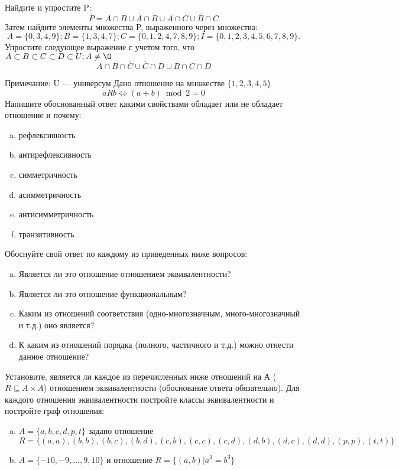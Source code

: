 \documentclass[10pt]{exam}
\begin{document}
\begin{questions}
\question
Найдите и упростите P:
\begin{equation*}
\overline{P} = A \cap B \cup \overline{A} \cap \overline{B} \cup A \cap C \cup \overline{B} \cap C
\end{equation*}
Затем найдите элементы множества P, выраженного через множества:
\begin{equation*}
A = \{0, 3, 4, 9\}; 
B = \{1, 3, 4, 7\};
C = \{0, 1, 2, 4, 7, 8, 9\};
I = \{0, 1, 2, 3, 4, 5, 6, 7, 8, 9\}.
\end{equation*}\question
Упростите следующее выражение с учетом того, что $A\subset B \subset C \subset D \subset U; A \neq \O$
\begin{equation*}
A \cap B  \cap \overline{C} \cup \overline{C} \cap D \cup B \cap C \cap D
\end{equation*}

Примечание: U — универсум\question
Дано отношение на множестве $\{1, 2, 3, 4, 5\}$ 
\begin{equation*}
aRb \iff (a+b) \bmod 2 =0
\end{equation*}
Напишите обоснованный ответ какими свойствами обладает или не обладает отношение и почему:   
\begin{enumerate} [a)]\setcounter{enumi}{0}
\item рефлексивность
\item антирефлексивность
\item симметричность
\item асимметричность
\item антисимметричность
\item транзитивность
\end{enumerate}

Обоснуйте свой ответ по каждому из приведенных ниже вопросов:
\begin{enumerate} [a)]\setcounter{enumi}{0}
    \item Является ли это отношение отношением эквивалентности?
    \item Является ли это отношение функциональным?
    \item Каким из отношений соответствия (одно-многозначным, много-многозначный и т.д.) оно является?
    \item К каким из отношений порядка (полного, частичного и т.д.) можно отнести данное отношение?
\end{enumerate}



\question
Установите, является ли каждое из перечисленных ниже отношений на А ($R \subseteq A \times A$) отношением эквивалентности (обоснование ответа обязательно). Для каждого отношения эквивалентности постройте классы 
эквивалентности и постройте граф отношения:
\begin{enumerate} [a)]\setcounter{enumi}{0}
\item $A = \{a, b, c, d, p, t\}$ задано отношение $R = \{(a, a), (b, b), (b, c), (b, d), (c, b), (c, c), (c, d), (d, b), (d, c), (d, d), (p,p), (t,t)\}$
\item $A = \{-10, -9, … , 9, 10\}$ и отношение $R = \{(a,b)|a^{3} = b^{3}\}$


\end{enumerate}
\end{questions}
\end{document}
